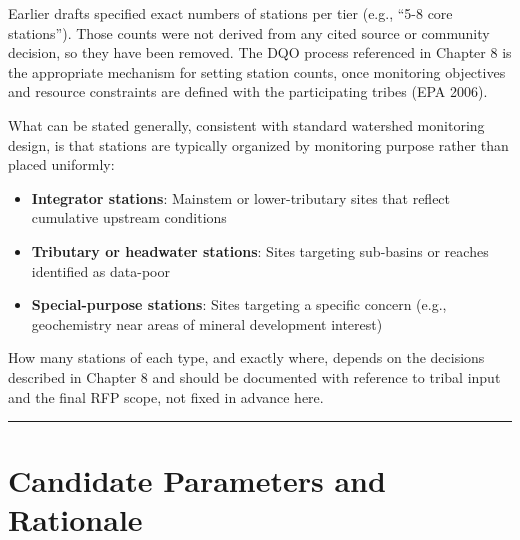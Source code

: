 \documentclass[
  letterpaper,
]{scrbook}
\providecommand{\tightlist}{%
  \setlength{\itemsep}{0pt}\setlength{\parskip}{0pt}}\usepackage{longtable,booktabs,array}
\begin{document}
\begin{tcolorbox}[enhanced jigsaw, rightrule=.15mm, breakable, titlerule=0mm, title=\textcolor{quarto-callout-important-color}{\faExclamation}\hspace{0.5em}{Station counts and tiers are not prescribed here}, coltitle=black, leftrule=.75mm, bottomrule=.15mm, left=2mm, toptitle=1mm, colframe=quarto-callout-important-color-frame, toprule=.15mm, arc=.35mm, colback=white, opacityback=0, colbacktitle=quarto-callout-important-color!10!white, opacitybacktitle=0.6, bottomtitle=1mm]

Earlier drafts specified exact numbers of stations per tier (e.g., ``5-8
core stations''). Those counts were not derived from any cited source or
community decision, so they have been removed. The DQO process
referenced in Chapter 8 is the appropriate mechanism for setting station
counts, once monitoring objectives and resource constraints are defined
with the participating tribes (EPA 2006).

\end{tcolorbox}

What can be stated generally, consistent with standard watershed
monitoring design, is that stations are typically organized by
monitoring purpose rather than placed uniformly:

\begin{itemize}
\tightlist
\item
  \textbf{Integrator stations}: Mainstem or lower-tributary sites that
  reflect cumulative upstream conditions
\item
  \textbf{Tributary or headwater stations}: Sites targeting sub-basins
  or reaches identified as data-poor
\item
  \textbf{Special-purpose stations}: Sites targeting a specific concern
  (e.g., geochemistry near areas of mineral development interest)
\end{itemize}

How many stations of each type, and exactly where, depends on the
decisions described in Chapter 8 and should be documented with reference
to tribal input and the final RFP scope, not fixed in advance here.

\begin{center}\rule{0.5\linewidth}{0.5pt}\end{center}

\section{Candidate Parameters and
Rationale}\label{candidate-parameters-and-rationale}
\end{document}
